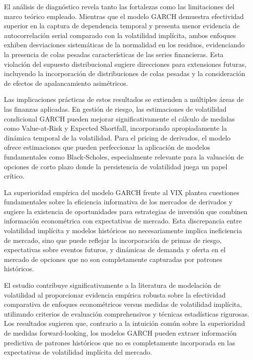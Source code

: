El análisis de diagnóstico revela tanto las fortalezas como las limitaciones del marco teórico empleado. Mientras que el modelo GARCH demuestra efectividad superior en la captura de dependencia temporal y presenta menor evidencia de autocorrelación serial comparado con la volatilidad implícita, ambos enfoques exhiben desviaciones sistemáticas de la normalidad en los residuos, evidenciando la presencia de colas pesadas características de las series financieras. Esta violación del supuesto distribucional sugiere direcciones para extensiones futuras, incluyendo la incorporación de distribuciones de colas pesadas y la consideración de efectos de apalancamiento asimétricos.

Las implicaciones prácticas de estos resultados se extienden a múltiples áreas de las finanzas aplicadas. En gestión de riesgo, las estimaciones de volatilidad condicional GARCH pueden mejorar significativamente el cálculo de medidas como Value-at-Risk y Expected Shortfall, incorporando apropiadamente la dinámica temporal de la volatilidad. Para el pricing de derivados, el modelo ofrece estimaciones que pueden perfeccionar la aplicación de modelos fundamentales como Black-Scholes, especialmente relevante para la valuación de opciones de corto plazo donde la persistencia de volatilidad juega un papel crítico.

La superioridad empírica del modelo GARCH frente al VIX plantea cuestiones fundamentales sobre la eficiencia informativa de los mercados de derivados y sugiere la existencia de oportunidades para estrategias de inversión que combinen información econométrica con expectativas de mercado. Esta discrepancia entre volatilidad implícita y modelos históricos no necesariamente implica ineficiencia de mercado, sino que puede reflejar la incorporación de primas de riesgo, expectativas sobre eventos futuros, y dinámicas de demanda y oferta en el mercado de opciones que no son completamente capturadas por patrones históricos.

El estudio contribuye significativamente a la literatura de modelación de volatilidad al proporcionar evidencia empírica robusta sobre la efectividad comparativa de enfoques econométricos versus medidas de volatilidad implícita, utilizando criterios de evaluación comprehensivos y técnicas estadísticas rigurosas. Los resultados sugieren que, contrario a la intuición común sobre la superioridad de medidas forward-looking, los modelos GARCH pueden extraer información predictiva de patrones históricos que no es completamente incorporada en las expectativas de volatilidad implícita del mercado.

